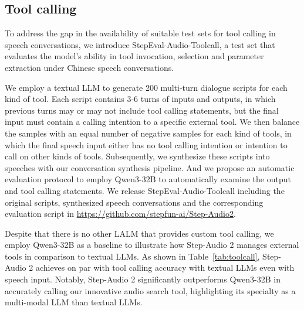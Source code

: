 \subsection{Tool calling}

To address the gap in the availability of suitable test sets for tool calling in speech conversations, we introduce StepEval-Audio-Toolcall, a test set that evaluates the model's ability in tool invocation, selection and parameter extraction under Chinese speech conversations.

We employ a textual LLM to generate 200 multi-turn dialogue scripts for each kind of tool.
Each script contains 3-6 turns of inputs and outputs, in which
previous turns may or may not include tool calling statements,
but the final input must contain a calling intention to a specific external tool.
We then balance the samples with an equal number of negative samples for each kind of tools, 
in which the final speech input either has no tool calling intention or intention to call on other kinds of tools. 
Subsequently, we synthesize these scripts into speeches with our conversation synthesis pipeline.
And we propose an automatic evaluation protocol to employ Qwen3-32B to automatically examine the output and tool calling statements.  
We release StepEval-Audio-Toolcall including the original scripts, synthesized speech conversations and the corresponding evaluation script in \url{https://github.com/stepfun-ai/Step-Audio2}.

Despite that there is no other LALM that provides custom tool calling,
we employ Qwen3-32B as a baseline to illustrate how Step-Audio 2 manages external tools in comparison to textual LLMs.
As shown in Table~\ref{tab:toolcall}, 
Step-Audio 2 achieves on par with tool calling accuracy with textual LLMs even with speech input.
Notably, Step-Audio 2 significantly
outperforms Qwen3-32B in accurately calling our innovative audio search tool,
highlighting its specialty as a multi-modal LLM than textual LLMs.

